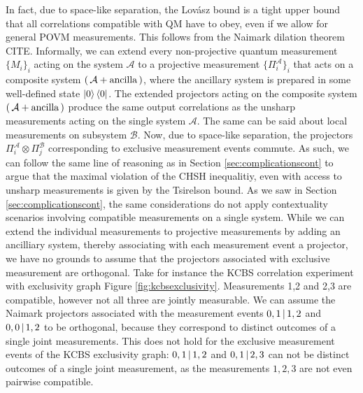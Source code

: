 In fact, due to space-like separation, the Lovász bound is a tight upper bound that all correlations compatible with QM have to obey, even if we allow for general POVM measurements. This follows from the Naimark dilation theorem CITE. Informally, we can extend every non-projective quantum measurement $\{M_i\}_i$ acting on the system $\mathcal{A}$ to a projective measurement $\{\Pi_i^{\mathcal{A}}\}_i$ that acts on a composite system $(\thinspace\mathcal{A}+\text{ancilla}\thinspace)$, where the ancillary system is prepared in some well-defined state $\ket{0}\bra{0}$. The extended projectors acting on the composite system $(\thinspace\mathcal{A}+\text{ancilla}\thinspace)$ produce the same output correlations as the unsharp measurements acting on the single system $\mathcal{A}$. The same can be said about local measurements on subsystem $\mathcal{B}$. Now, due to space-like separation, the projectors $\Pi_i^{\mathcal{A}}\otimes \Pi_j^{\mathcal{B}}$ corresponding to exclusive measurement events commute. As such, we can follow the same line of reasoning as in Section \ref{sec:complicationscont} to argue that the maximal violation of the CHSH inequalitiy, even with access to unsharp measurements is given by the Tsirelson bound. As we saw in Section \ref{sec:complicationscont}, the same considerations do not apply contextuality scenarios involving compatible measurements on a single system. While we can extend the individual measurements to projective measurements by adding an ancilliary system, thereby associating with each measurement event a projector, we have no grounds to assume that the projectors associated with exclusive measurement are orthogonal. Take for instance the KCBS correlation experiment with exclusivity graph Figure \ref{fig:kcbsexclusivity}. Measurements 1,2 and 2,3 are compatible, however not all three are jointly measurable. We can assume the Naimark projectors associated with the measurement events $0,1\thinspace\vert\thinspace 1,2$ and $0,0\thinspace\vert\thinspace 1,2$ to be orthogonal, because they correspond to distinct outcomes of a single joint measurements. This does not hold for the exclusive measurement events of the KCBS exclusivity graph: $0,1\thinspace\vert\thinspace 1,2$ and $0,1\thinspace\vert\thinspace 2,3$ can not be distinct outcomes of a single joint measurement, as the measurements $1,2,3$ are not even pairwise compatible.

